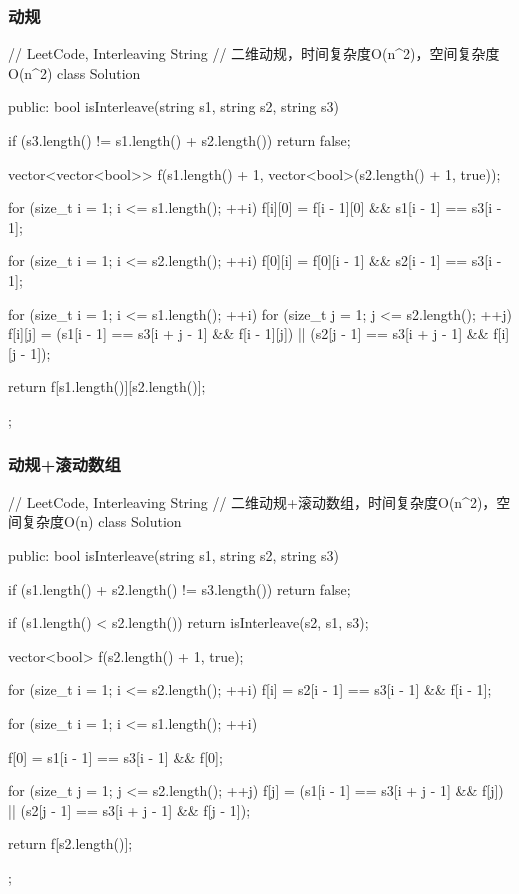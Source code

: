 \subsubsection{动规}
\begin{Code}
// LeetCode, Interleaving String
// 二维动规，时间复杂度O(n^2)，空间复杂度O(n^2)
class Solution {
public:
    bool isInterleave(string s1, string s2, string s3) {
        if (s3.length() != s1.length() + s2.length())
            return false;

        vector<vector<bool>> f(s1.length() + 1,
                vector<bool>(s2.length() + 1, true));

        for (size_t i = 1; i <= s1.length(); ++i)
            f[i][0] = f[i - 1][0] && s1[i - 1] == s3[i - 1];

        for (size_t i = 1; i <= s2.length(); ++i)
            f[0][i] = f[0][i - 1] && s2[i - 1] == s3[i - 1];

        for (size_t i = 1; i <= s1.length(); ++i)
            for (size_t j = 1; j <= s2.length(); ++j)
                f[i][j] = (s1[i - 1] == s3[i + j - 1] && f[i - 1][j])
                        || (s2[j - 1] == s3[i + j - 1] && f[i][j - 1]);

        return f[s1.length()][s2.length()];
    }
};
\end{Code}


\subsubsection{动规+滚动数组}
\begin{Code}
// LeetCode, Interleaving String
// 二维动规+滚动数组，时间复杂度O(n^2)，空间复杂度O(n)
class Solution {
public:
    bool isInterleave(string s1, string s2, string s3) {
        if (s1.length() + s2.length() != s3.length())
            return false;

        if (s1.length() < s2.length())
            return isInterleave(s2, s1, s3);

        vector<bool> f(s2.length() + 1, true);

        for (size_t i = 1; i <= s2.length(); ++i)
            f[i] = s2[i - 1] == s3[i - 1] && f[i - 1];

        for (size_t i = 1; i <= s1.length(); ++i) {
            f[0] = s1[i - 1] == s3[i - 1] && f[0];

            for (size_t j = 1; j <= s2.length(); ++j)
                f[j] = (s1[i - 1] == s3[i + j - 1] && f[j])
                        || (s2[j - 1] == s3[i + j - 1] && f[j - 1]);
        }

        return f[s2.length()];
    }
};
\end{Code}


